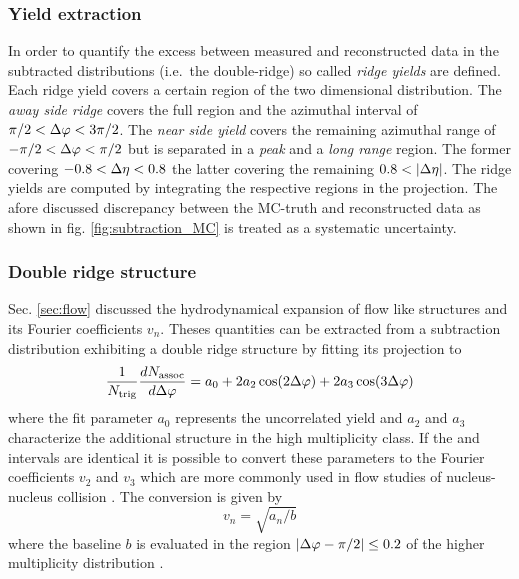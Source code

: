 \subsubsection{Yield extraction}
\label{sec:yield_extraction}

In order to quantify the excess between measured and reconstructed data in the subtracted distributions (i.e.\ the double-ridge) so called \emph{ridge yields} are defined. Each ridge yield covers a certain region of the two dimensional distribution. The \emph{away side ridge} covers the full \deta region and the azimuthal interval of $\pi / 2 < \Delta\varphi < 3\pi /2$. The \emph{near side yield} covers the remaining azimuthal range of $-\pi / 2 < \Delta\varphi < \pi /2$ but is separated in a \emph{peak} and a \emph{long range} region. The former covering $-0.8 < \Delta\eta < 0.8$ the latter covering the remaining $0.8 < |\Delta\eta |$. The ridge yields are computed by integrating the respective regions in the \dphi projection. The afore discussed discrepancy between the MC-truth and reconstructed data as shown in fig. \ref{fig:subtraction_MC} is treated as a systematic uncertainty.

\subsubsection{Double ridge structure}
\label{sec:double_ridge}

Sec. \ref{sec:flow} discussed the hydrodynamical expansion of flow like structures and its Fourier coefficients $ v_n$. Theses quantities can be extracted from a subtraction distribution exhibiting a double ridge structure by fitting its \dphi projection to
\begin{equation}
  \label{eq:double_cosin_fit}
  \frac{1}{N_{\text{trig}}}\frac{dN_{\text{assoc}}}{d\Delta\varphi} =
  a_0 + 2a_2 \cos (2\Delta\varphi )+ 2a_3 \cos (3\Delta\varphi )
\end{equation}
where the fit parameter $a_0$ represents the uncorrelated yield and $a_2$ and $a_3$ characterize the additional structure in the high multiplicity class. If the \ptassoc and \pttrig intervals are identical it is possible to convert these parameters to the Fourier coefficients $v_2$ and $v_3$ which are more commonly used in flow studies of nucleus-nucleus collision \cite{Voloshin1994}. The conversion is given by
\begin{equation}
  \label{eq:v_n}
  v_n = \sqrt{a_n / b}
\end{equation}
where the baseline $b$ is evaluated in the region $|\Delta\varphi - \pi /2 | \le 0.2$ of the higher multiplicity distribution \cite{Abelev2012}.


